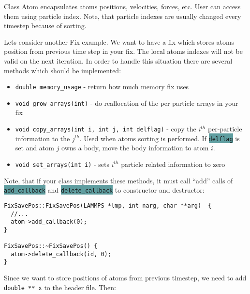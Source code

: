 \documentclass{article}
\newcommand{\code}[1]{\colorbox{cadetblue}{\color{white}\texttt{#1}}}
\begin{document}
Class Atom encapsulates atoms positions, velocities, forces, etc. User
can access them using particle index. Note, that particle indexes are
usually changed every timestep because of sorting.

Lets consider another Fix example. We want to have a fix which stores
atoms position from previous time step in your fix. The local atoms
indexes will not be valid on the next iteration. In order to handle
this situation there are several methods which should be implemented:

\begin{itemize}
\item \texttt{double memory_usage} - return how much memory fix uses
\item \texttt{void grow_arrays(int)} - do reallocation of the per particle arrays
  in your fix
\item \texttt{void copy_arrays(int i, int j, int delflag)} - copy the $i^{th}$ per-particle
  information to the $j^{th}$. Used when atoms sorting is performed. If \code{delflag} is set
  and atom $j$ owns a body, move the body information to atom $i$.
\item \texttt{void set_arrays(int i)} - sets $i^{th}$ particle related information to zero
\end{itemize}

Note, that if your class implements these methods, it must call ``add'' calls of
\code{add\_callback} and \code{delete\_callback} to constructor and destructor:

\begin{center}
\begin{verbatim}
FixSavePos::FixSavePos(LAMMPS *lmp, int narg, char **arg)  {
  //...
  atom->add_callback(0);
}

FixSavePos::~FixSavePos() {
  atom->delete_callback(id, 0);
}
\end{verbatim}
\end{center}

Since we want to store positions of atoms from previous timestep, we
need to add \texttt{double ** x} to the header file. Then:
\end{document}
